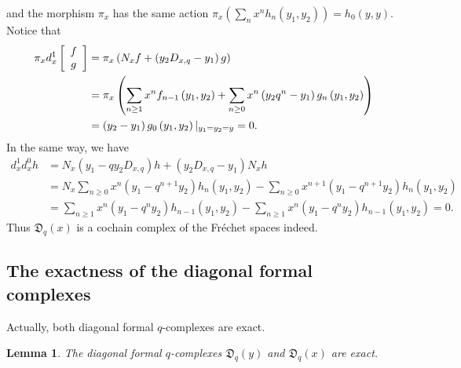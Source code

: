 \documentclass[12pt,reqno]{amsart}%
\theoremstyle{plain}
\newtheorem{lemma}{Lemma}
\numberwithin{theorem}{section} \numberwithin{equation}{section}
\numberwithin{lemma}{section}
\numberwithin{remark}{section}
\numberwithin{example}{section}
\numberwithin{proposition}{section}
\numberwithin{definition}{section}
\numberwithin{corollary}{section}
\begin{document}
and the morphism $\pi_{x}$ has the same action $\pi_{x}\left(  \sum_{n}%
x^{n}h_{n}\left(  y_{1},y_{2}\right)  \right)  =h_{0}\left(  y,y\right)  $.
Notice that
\begin{align*}
\pi_{x}d_{x}^{1}\left[
\begin{array}
[c]{c}%
f\\
g
\end{array}
\right]   &  =\pi_{x}\left(  N_{x}f+\left(  y_{2}D_{x,q}-y_{1}\right)
g\right) \\
&  =\pi_{x}\left(  \sum_{n\geq1}x^{n}f_{n-1}\left(  y_{1},y_{2}\right)
+\sum_{n\geq0}x^{n}\left(  y_{2}q^{n}-y_{1}\right)  g_{n}\left(  y_{1}%
,y_{2}\right)  \right) \\
&  =\left(  y_{2}-y_{1}\right)  g_{0}\left(  y_{1},y_{2}\right)
|_{y_{1}=y_{2}=y}=0.
\end{align*}
In the same way, we have
\begin{align*}
d_{x}^{1}d_{x}^{0}h  &  =N_{x}\left(  y_{1}-qy_{2}D_{x,q}\right)  h+\left(
y_{2}D_{x,q}-y_{1}\right)  N_{x}h\\
&  =N_{x}\sum_{n\geq0}x^{n}\left(  y_{1}-q^{n+1}y_{2}\right)  h_{n}\left(
y_{1},y_{2}\right)  -\sum_{n\geq0}x^{n+1}\left(  y_{1}-q^{n+1}y_{2}\right)
h_{n}\left(  y_{1},y_{2}\right) \\
&  =\sum_{n\geq1}x^{n}\left(  y_{1}-q^{n}y_{2}\right)  h_{n-1}\left(
y_{1},y_{2}\right)  -\sum_{n\geq1}x^{n}\left(  y_{1}-q^{n}y_{2}\right)
h_{n-1}\left(  y_{1},y_{2}\right)  =0.
\end{align*}
Thus $\mathfrak{D}_{q}\left(  x\right)  $ is a cochain complex of the
Fr\'{e}chet spaces indeed.

\subsection{The exactness of the diagonal formal complexes}

Actually, both diagonal formal $q$-complexes are exact.

\begin{lemma}
\label{lemLDc1}The diagonal formal $q$-complexes $\mathfrak{D}_{q}\left(
y\right)  $ and $\mathfrak{D}_{q}\left(  x\right)  $ are exact.
\end{lemma}
\end{document}
